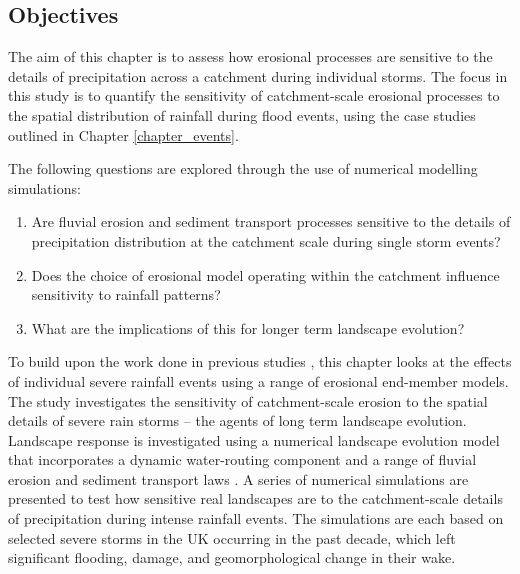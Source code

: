 \subsection{Objectives}
The aim of this chapter is to assess how erosional processes are sensitive to the details of precipitation across a catchment during individual storms. The focus in this study is to quantify the sensitivity of catchment-scale erosional processes to the spatial distribution of rainfall during flood events, using the case studies outlined in Chapter \ref{chapter_events}.

The following questions are explored through the use of numerical modelling simulations:

\begin{enumerate}
\item Are fluvial erosion and sediment transport processes sensitive to the details of precipitation distribution at the catchment scale during single storm events?
\item Does the choice of erosional model operating within the catchment influence sensitivity to rainfall patterns? 
\item What are the implications of this for longer term landscape evolution? 
\end{enumerate}

To build upon the work done in previous studies \citep[e.g.][]{coulthard2016sensitivity}, this chapter looks at the effects of individual severe rainfall events using a range of erosional end-member models. The study investigates the sensitivity of catchment-scale erosion to the spatial details of severe rain storms -- the agents of long term landscape evolution. Landscape response is investigated using a numerical landscape evolution model that incorporates a dynamic water-routing component \citep{bates2010simple} and a range of fluvial erosion and sediment transport laws \citep{howard1983channel,wilcock2003surface,whipple1999dynamics}. A series of numerical simulations are presented to test how sensitive real landscapes are to the catchment-scale details of precipitation during intense rainfall events. The simulations are each based on selected severe storms in the UK occurring in the past decade, which left significant flooding, damage, and geomorphological change in their wake.

